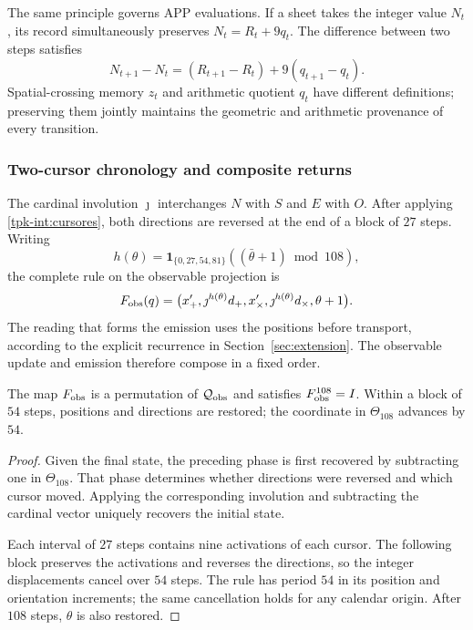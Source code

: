 The same principle governs APP evaluations. If a sheet takes the integer
value \(N_t\), its record simultaneously preserves
\(N_t=R_t+9q_t\). The difference between two steps satisfies
\[
 N_{t+1}-N_t=(R_{t+1}-R_t)+9(q_{t+1}-q_t).
\]
Spatial-crossing memory \(z_t\) and arithmetic quotient \(q_t\)
have different definitions; preserving them jointly maintains the
geometric and arithmetic provenance of every transition.

\subsubsection{Two-cursor chronology and composite returns}
\label{tpk-int:cronologia}

The cardinal involution \(\jmath\) interchanges \(N\) with \(S\) and
\(E\) with \(O\). After applying \eqref{tpk-int:cursores}, both
directions are reversed at the end of a block of \(27\) steps.
Writing
\[
 h(\theta)=\mathbf1_{\{0,27,54,81\}}
             ((\bar\theta+1)\bmod108),
\]
the complete rule on the observable projection is
\begin{equation}
 F_{\rm obs}(q)=
 \bigl(x_+',\jmath^{h(\theta)}d_+,
       x_\times',\jmath^{h(\theta)}d_\times,
       \theta+1\bigr).
 \label{tpk-int:fobs}
\end{equation}
The reading that forms the emission uses the positions before transport,
according to the explicit recurrence in Section~\ref{sec:extension}.
The observable update and emission therefore compose in a fixed order.

\begin{proposition}
\label{tpk-int:periodo}
The map \(F_{\rm obs}\) is a permutation of
\(\mathcal Q_{\rm obs}\) and satisfies \(F_{\rm obs}^{108}=I\).
Within a block of \(54\) steps, positions and directions are restored;
the coordinate in \(\Theta_{108}\) advances by \(54\).
\end{proposition}
\begin{proof}
Given the final state, the preceding phase is first recovered by subtracting
one in \(\Theta_{108}\). That phase determines whether directions were
reversed and which cursor moved. Applying the corresponding involution
and subtracting the cardinal vector uniquely recovers the initial state.

Each interval of \(27\) steps contains nine activations of each cursor.
The following block preserves the activations and reverses the directions,
so the integer displacements cancel over \(54\) steps. The rule has
period \(54\) in its position and orientation increments; the same
cancellation holds for any calendar origin. After \(108\) steps,
\(\theta\) is also restored.
\end{proof}


